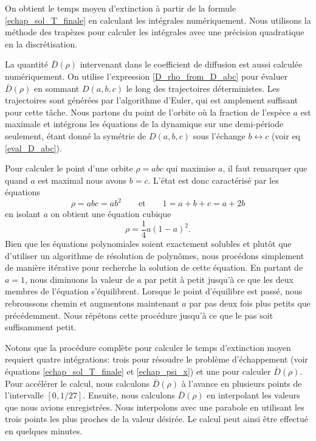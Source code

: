 \documentclass[openany,a4paper,12pt]{article}
\begin{document}
\par On obtient le temps moyen d'extinction à partir de la formule \ref{echap_sol_T_finale} en calculant les intégrales numériquement. Nous utilisons la méthode des trapèzes pour calculer les intégrales avec une précision quadratique en la discrétisation.

\par La quantité $\bar D(\rho)$ intervenant dans le coefficient de diffusion est aussi calculée numériquement. On utilise l'expression \ref{D_rho_from_D_abc} pour évaluer $\bar D(\rho)$ en sommant $D(a,b,c)$ le long des trajectoires déterministes. Les trajectoires sont générées par l'algorithme d'Euler, qui est amplement suffisant pour cette tâche. Nous partons du point de l'orbite où la fraction de l'espèce $a$ est maximale et intégrons les équations de la dynamique sur une demi-période seulement, étant donné la symétrie de $D(a,b,c)$ sous l'échange $b\leftrightarrow c$ (voir eq \ref{eval_D_abc}).

\par Pour calculer le point d'une orbite $\rho = abc$ qui maximise $a$, il faut remarquer que quand $a$ est maximal nous avons $b=c$. L'état est donc caractérisé par les équations 
%
\begin{equation}\label{syst_a_max}
	\rho = abc = ab^2  \qquad \text{et} \qquad 1 = a+b+c = a+2b
\end{equation}
%
en isolant $a$ on obtient une équation cubique 
%
\begin{equation}\label{eq_a_max}
	\rho = \frac 14 a (1-a)^2.
\end{equation}
%
Bien que les équations polynomiales soient exactement solubles et plutôt que d'utiliser un algorithme de résolution de polynômes, nous procédons simplement de manière itérative pour recherche la solution de cette équation. En partant de $a=1$, nous diminuons la valeur de $a$ par petit à petit jusqu'à ce que les deux membres de l'équation s'équilibrent. Lorsque le point d'équilibre est passé, nous rebroussons chemin et augmentons maintenant $a$ par pas deux fois plus petits que précédemment. Nous répétons cette procédure jusqu'à ce que le pas soit suffisamment petit.

\par Notons que la procédure complète pour calculer le temps d'extinction moyen requiert quatre intégrations: trois pour résoudre le problème d'échappement (voir équations \ref{echap_sol_T_finale} et \ref{echap_psi_x}) et une pour calculer $\bar D(\rho)$. Pour accélérer le calcul, nous calculons $\bar D(\rho)$ à l'avance en plusieurs points de l'intervalle $[0,1/27]$. Ensuite, nous calculons $\bar D(\rho)$ en interpolant les valeurs que nous avions enregistrées. Nous interpolons avec une parabole en utilisant les trois points les plus proches de la valeur désirée. Le calcul peut ainsi être effectué en quelques minutes.
\end{document}
